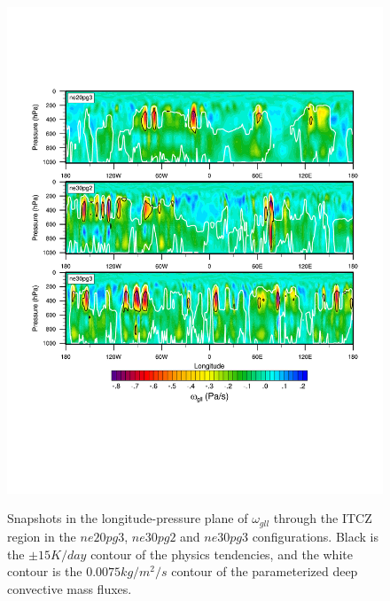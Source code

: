 \documentclass{agujournal}
\begin{document}
\begin{figure}[t]
\begin{center}
\noindent\includegraphics[width=30pc,angle=0]{figs/panel_transGLL.pdf}\\
\end{center}
\caption{Snapshots in the longitude-pressure plane of $\omega_{gll}$ through the ITCZ region in the $ne20pg3$, $ne30pg2$ and $ne30pg3$ configurations. Black is the $\pm 15 K/day$ contour of the physics tendencies, and the white contour is the $0.0075 kg/m^2/s$ contour of the parameterized deep convective mass fluxes.}
\label{fig:transx}
\end{figure}
\end{document}
